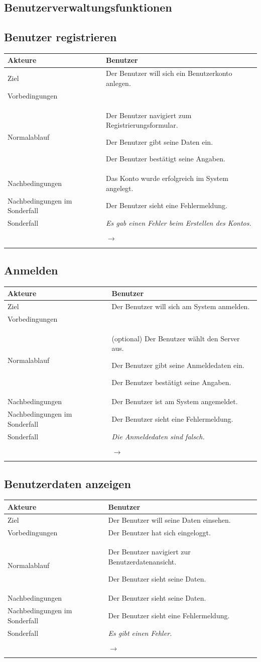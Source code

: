 \documentclass[a4paper,10pt,titlepage]{article}
\makeatletter
\newcommand\novspace{\@minipagetrue}
\newenvironment{owncompactitem}{%
\compactitem
}{%
\@finalstrut\@arstrutbox
\@nameuse{endcompactitem}%
\aftergroup\let\aftergroup\@finalstrut\aftergroup\@gobble
}
\newenvironment{owncompactenum}{%
\compactenum
}{%
\@finalstrut\@arstrutbox
\@nameuse{endcompactenum}%
\aftergroup\let\aftergroup\@finalstrut\aftergroup\@gobble
}
\newcommand{\usecase}[7]
{\subsection{#1}
\setlength{\extrarowheight}{2pt}
\begin{tabular}{|p{0.2\textwidth}|p{0.9\textwidth}|}
\hline
  Akteure & #2\\\hline
  Ziel & #3\\\hline
  Vorbedingungen & \novspace
  	\begin{owncompactitem}[-] #4 \end{owncompactitem} \\\hline
  Normalablauf & \vspace{-7pt}
  	\begin{owncompactenum}[1.] #6 \end{owncompactenum} \\\hline
  Nachbedingungen & \novspace
  	\begin{owncompactitem}[-] #5 \end{owncompactitem} \\\hline
  #7
\end{tabular}
}
\newcommand{\kurzersonderfall}[3][\empty]
{
Sonderfall #2 & \vspace{-10pt}
	\textit{#3}
  	\ifthenelse{\equal{#1}{\empty}}
    	{\\\hline} %
    	{\\&\ensuremath{\rightarrow} #1 \\ [+1pt] \hline} %

}
\newcommand{\sondernachbedingung}[1]
{
Nachbedingungen im Sonderfall& \novspace
	\begin{owncompactitem}[-]
		#1
	\end{owncompactitem} \\\hline
}
\makeatother
\begin{document}
\subsection*{Benutzerverwaltungsfunktionen}
\usecase{Benutzer registrieren}{Benutzer}%
{%
Der Benutzer will sich ein Benutzerkonto anlegen.
}{%
	\item 
}{%
	\item Das Konto wurde erfolgreich im System angelegt.
}{%
	\item Der Benutzer navigiert zum Registrierungsformular.
	\item Der Benutzer gibt seine Daten ein.
	\item Der Benutzer bestätigt seine Angaben.
}{%
\sondernachbedingung{
	\item Der Benutzer sieht eine Fehlermeldung.
	}
\kurzersonderfall[]{}%
	{%
	Es gab einen Fehler beim Erstellen des Kontos.
	}
}

\usecase{Anmelden}{Benutzer}%
{%
Der Benutzer will sich am System anmelden.
}{%
	\item 
}{%
	\item Der Benutzer ist am System angemeldet.
}{%
	\item (optional) Der Benutzer wählt den Server aus.
	\item Der Benutzer gibt seine Anmeldedaten ein.
	\item Der Benutzer bestätigt seine Angaben.
}{%
\sondernachbedingung{
	\item Der Benutzer sieht eine Fehlermeldung.
	}
\kurzersonderfall[]{}%
	{%
	Die Anmeldedaten sind falsch.
	}
}

\usecase{Benutzerdaten anzeigen}{Benutzer}%
{%
Der Benutzer will seine Daten einsehen.
}{%
	\item Der Benutzer hat sich eingeloggt.
}{%
	\item Der Benutzer sieht seine Daten.
}{%
	\item Der Benutzer navigiert zur Benutzerdatenansicht.
	\item Der Benutzer sieht seine Daten.
}{%
\sondernachbedingung{
	\item Der Benutzer sieht eine Fehlermeldung.
	}
\kurzersonderfall[]{}%
	{%
	Es gibt einen Fehler.
	}
}
\end{document}
